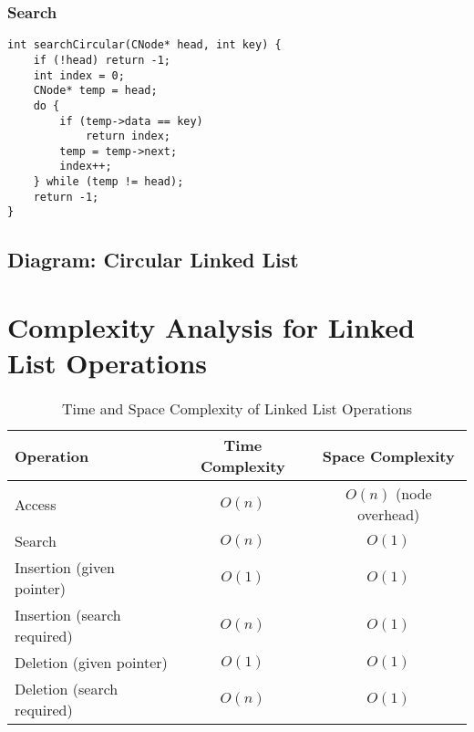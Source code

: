 \subsubsection{Search}
\begin{lstlisting}[style=cppstyle, caption={Search in Circular Linked List}]
int searchCircular(CNode* head, int key) {
    if (!head) return -1;
    int index = 0;
    CNode* temp = head;
    do {
        if (temp->data == key)
            return index;
        temp = temp->next;
        index++;
    } while (temp != head);
    return -1;
}
\end{lstlisting}

\subsection{Diagram: Circular Linked List}
\begin{center}
\end{center}

\section{Complexity Analysis for Linked List Operations}
\begin{table}[H]
\centering
\renewcommand{\arraystretch}{1.5}
\begin{tabular}{|l|c|c|}
\hline
\textbf{Operation} & \textbf{Time Complexity} & \textbf{Space Complexity} \\ \hline
Access             & \(O(n)\)  & \(O(n)\) (node overhead) \\ \hline
Search             & \(O(n)\)  & \(O(1)\) \\ \hline
Insertion (given pointer) & \(O(1)\) & \(O(1)\) \\ \hline
Insertion (search required) & \(O(n)\) & \(O(1)\) \\ \hline
Deletion (given pointer) & \(O(1)\) & \(O(1)\) \\ \hline
Deletion (search required) & \(O(n)\) & \(O(1)\) \\ \hline
\end{tabular}
\caption{Time and Space Complexity of Linked List Operations}
\end{table}

